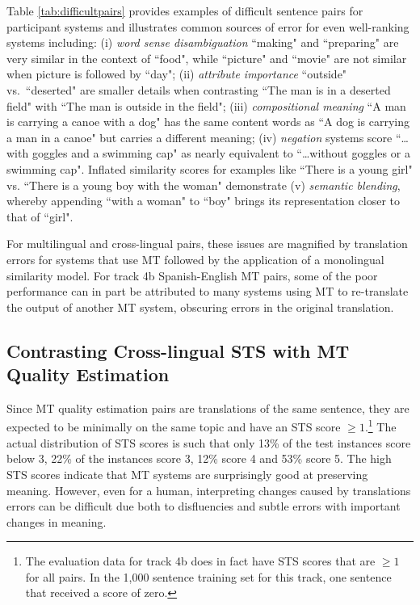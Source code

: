 \documentclass[11pt,a4paper]{article}
\begin{document}
Table \ref{tab:difficultpairs} provides examples of difficult sentence pairs for participant systems and illustrates common sources of error for even well-ranking systems including: (i) {\it word sense disambiguation} ``making" and ``preparing" are very similar in the context of ``food", while ``picture" and ``movie" are not similar when picture is followed by ``day";  (ii) {\it attribute importance} ``outside" vs.\ ``deserted" are smaller details when contrasting ``The man is in a deserted field" with ``The man is outside in the field"; (iii) {\it compositional meaning} ``A man is carrying a canoe with a dog" has the same content words as ``A dog is carrying a man in a canoe" but carries a different meaning; (iv) {\it negation} systems score ``\dots with goggles and a swimming cap" as nearly equivalent to ``\dots without goggles or a swimming cap". Inflated similarity scores for examples like ``There is a young girl" vs. ``There is a young boy with the woman" demonstrate (v) {\it semantic blending}, whereby appending ``with a woman" to ``boy" brings its representation closer to that of ``girl". 

For multilingual and cross-lingual pairs, these issues are magnified by translation errors for systems that use MT followed by the application of a monolingual similarity model. For  track 4b Spanish-English MT pairs, some of the poor performance can in part be attributed to many systems using MT to re-translate the output of another MT system, obscuring errors in the original translation.

\subsection{Contrasting Cross-lingual STS with MT Quality Estimation}

Since MT quality estimation pairs are translations of the same sentence, they are expected to be minimally on the same topic and have an STS score $\geq 1$.\footnote{The evaluation data for track 4b does in fact have STS scores that are $\geq 1$ for all pairs. In the 1,000 sentence training set for this track,  one sentence that received a score of zero.} The actual distribution of STS scores is such that only 13\% of the test instances score below 3, 22\% of the instances score 3, 12\% score 4 and 53\% score 5. The high STS scores indicate that MT systems are surprisingly good at preserving meaning. However, even for a human, interpreting changes caused by translations errors can be difficult due both to disfluencies and subtle errors with important changes in meaning.
\end{document}

